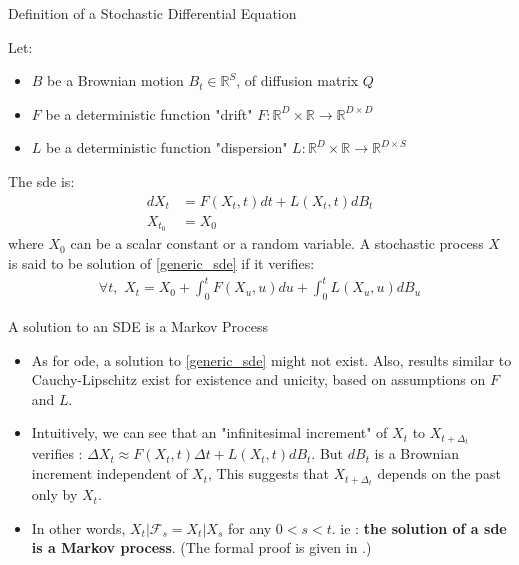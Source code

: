 %
%

\begin{frame}{Definition of a Stochastic Differential Equation}
    \begin{definition}
            Let:
    \begin{itemize}
        \item $B$ be a Brownian motion $B_t \in \mathbb{R}^S$, of diffusion matrix $Q$
        \item $F$ be a deterministic function "drift" $F : \mathbb{R}^D \times \mathbb{R}\rightarrow \mathbb{R}^{D \times D}$
        \item $L$ be a deterministic function "dispersion" $L : \mathbb{R}^D \times \mathbb{R}\rightarrow \mathbb{R}^{D \times S}$ 
    \end{itemize}

    The \gls{sde} is:
    \begin{align}
        \label{generic_sde}
        dX_t &= F(X_t,t) dt + L(X_t,t) dB_t \\
        X_{t_0} &= X_0
    \end{align}
    where $X_0$ can be a scalar constant or a random variable.
    A stochastic process $X$ is said to be solution of \ref{generic_sde} if it verifies:
    \begin{align*}
        \forall t, \,\, X_t = X_0 + \int_{0}^{t} F(X_u, u)du + \int_{0}^{t} L(X_u,u) dB_u
    \end{align*}
    \end{definition}
\end{frame}

\begin{frame}{A solution to an SDE is a Markov Process}
\begin{itemize}
    \item As for \gls{ode}, a solution to \ref{generic_sde} might not exist. Also, results similar to Cauchy-Lipschitz 
exist for existence and unicity, based on assumptions on $F$ and $L$. 
    \item Intuitively, we can see that an "infinitesimal increment" of $X_t$ to $X_{t+\Delta_t}$ verifies :
$\Delta {X_t} \approx F(X_t, t) \Delta t + L(X_t,t) dB_t$. But $dB_t$ is a Brownian increment independent of $X_t$,
This suggests that $X_{t+ \Delta_t}$ depends on the past only by $X_t$. 
    \item In other words, $X_t \vert \mathcal{F}_s = X_t \vert X_s$ 
for any $0 < s < t$. ie : \textbf{the solution of a \gls{sde} is a Markov process}. (The formal proof is given in \cite{mouvement-brownien-calcul-ito}.)
\end{itemize}
\end{frame}

